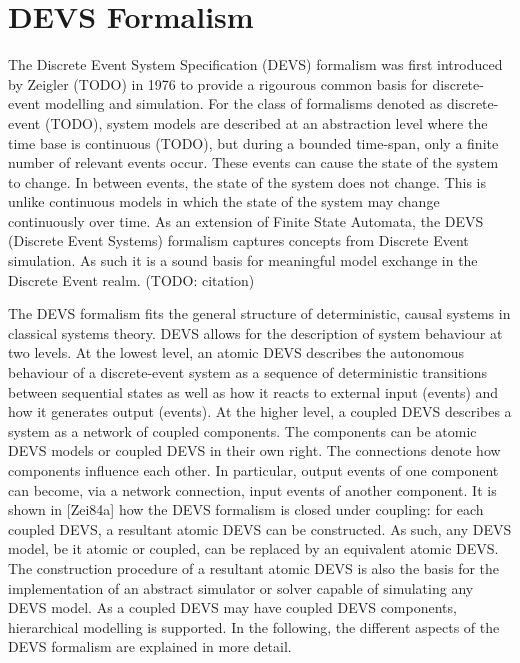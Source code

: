 \section{DEVS Formalism}
The Discrete Event System Specification (DEVS)
formalism was first introduced by Zeigler (TODO) in 1976 to provide a rigourous common basis for discrete-event modelling and 
simulation. For the class of formalisms denoted as discrete-event (TODO), system models are described at an abstraction 
level where the time base is continuous (TODO), but during a bounded time-span, only a finite number of relevant events 
occur. These events can cause the state of the system to change. In between events, the state of the system does not 
change. This is unlike continuous models in which the state of the system may change continuously over time. As an 
extension of Finite State Automata, the DEVS (Discrete Event Systems) formalism captures concepts from Discrete Event 
simulation. As such it is a sound basis for meaningful model exchange in the Discrete Event realm. (TODO: citation)

The DEVS formalism fits the general structure of deterministic, causal systems in classical systems theory. DEVS allows 
for the description of system behaviour at two levels. At the lowest level, an atomic DEVS describes the autonomous 
behaviour of a discrete-event system as a sequence of deterministic transitions between sequential states as well as 
how it reacts to external input (events) and how it generates output (events). At the higher level, a coupled DEVS 
describes a system as a network of coupled components. The components can be atomic DEVS models or coupled DEVS in their 
own right. The connections denote how components influence each other. In particular, output events of one component 
can become, via a network connection, input events of another component. It is shown in [Zei84a] how the DEVS formalism 
is closed under coupling: for each coupled DEVS, a resultant atomic DEVS can be constructed. As such, any DEVS model, 
be it atomic or coupled, can be replaced by an equivalent atomic DEVS. The construction procedure of a resultant atomic 
DEVS is also the basis for the implementation of an abstract simulator or solver capable of simulating any DEVS model. 
As a coupled DEVS may have coupled DEVS components, hierarchical modelling is supported. In the following, the different 
aspects of the DEVS formalism are explained in more detail.

